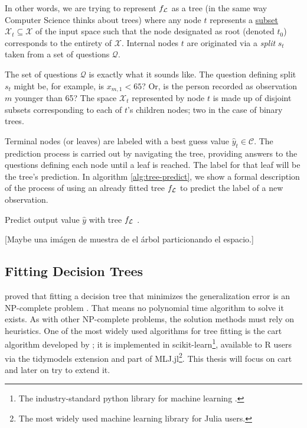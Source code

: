 In other words, we are trying to represent $f_{\mathcal{L}}$ as a tree (in the same way
Computer Science thinks about trees) where any node $t$ represents a
\underline{subset} $\mathcal{X}_t \subseteq \mathcal{X}$ of the input space such
that the node designated as root (denoted $t_0$) corresponds to the entirety of
$\mathcal{X}$.  Internal nodes $t$ are originated via a \textit{split} $s_t$
taken from a set of questions $\mathcal{Q}$.

The set of questions $\mathcal{Q}$ is exactly what it sounds like. The question
defining split $s_t$ might be, for example, is $x_{m, 1} < 65$? Or, is the person
recorded as observation $m$ younger than 65? The space $\mathcal{X}_t$
represented by node $t$ is made up of disjoint subsets corresponding to each
of $t$'s children nodes; two in the case of binary trees. 

Terminal nodes (or leaves) are labeled with a best guess value $\widehat{y}_t
\in \mathcal{C}$. The prediction process is carried out by navigating the tree,
providing answers to the questions defining each node until a leaf is reached.
The label for that leaf will be the tree's prediction. In algorithm
\ref{alg:tree-predict}, we show a formal description of the process of using an
already fitted tree $f_{\mathcal{L}}$ to predict the label of a new observation. 

\begin{algorithm}
    \caption[Tree prediction algorithm]{Predict output value $\widehat{y}$ with
        tree $f_{\mathcal{L}}$ \cite[Ch.~3.2]{louppe2014}.}
    \label{alg:tree-predict}
\end{algorithm}

[Maybe una imágen de muestra de el árbol particionando el espacio.]

\subsection{Fitting Decision Trees}

\citeauthor{hyafil1976} proved that fitting a decision tree that minimizes the
generalization error is an NP-complete problem \cite{hyafil1976}. That means no
polynomial time algorithm to solve it exists. As with other NP-complete
problems, the solution methods must rely on heuristics. One of the most widely
used algorithms for tree fitting is the \acl{cart} algorithm developed by
\citeauthor{breiman2017} \cite{breiman2017}; it is implemented in
scikit-learn\footnote{The industry-standard python library for machine learning
\cite{louppe2014}.}, available to R users via the tidymodels extension and part
of MLJ.jl\footnote{The most widely used machine learning library for Julia
users.}. This thesis will focus on \ac{cart} and later on try to extend it.

